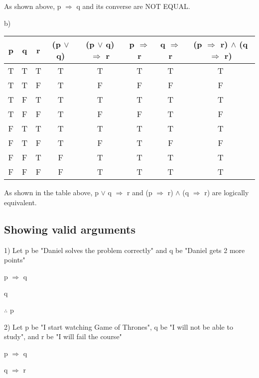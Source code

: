 \documentclass{article}
\begin{document}
    As shown above, p $\Rightarrow$ q and its converse are NOT EQUAL.\par\par
    
    \noindent
    b)
    
    \begin{center}
    \begin{tabular} {|| c c c c c c c c ||}
    \hline
    p & q & r & (p $\vee$ q) & (p $\vee$ q) $\Rightarrow$ r & p $\Rightarrow$ r & q $\Rightarrow$ r & (p $\Rightarrow$ r) $\wedge$ (q $\Rightarrow$ r) \\
    \hline \hline
    
    T & T & T & T & T & T & T & T \\
    \hline
    T & T & F & T & F & F & F & F \\
    \hline
    T & F & T & T & T & T & T & T \\
    \hline
    T & F & F & T & F & F & T & F \\
    \hline
    F & T & T & T & T & T & T & T \\
    \hline
    F & T & F & T & F & T & F & F \\
    \hline
    F & F & T & F & T & T & T & T \\
    \hline
    F & F & F & F & T & T & T & T \\
    \hline
    \end{tabular}
    \end{center}
    
    As shown in the table above, p $\vee$ q $\Rightarrow$ r and (p $\Rightarrow$ r) $\wedge$ (q $\Rightarrow$ r) are logically equivalent. \par\par
    
    
\subsection{Showing valid arguments}
    1) Let p be "Daniel solves the problem correctly" and q be "Daniel gets 2 more points" \par
    
    p $\Rightarrow$ q \par
    q \par
    $\therefore$ p \par\par
    \noindent
    
    2) Let p be "I start watching Game of Thrones", q be "I will not be able to study", and r be "I will fail the course" \par
    p $\Rightarrow$ q \par
    q $\Rightarrow$ r \par
    
\end{document}
